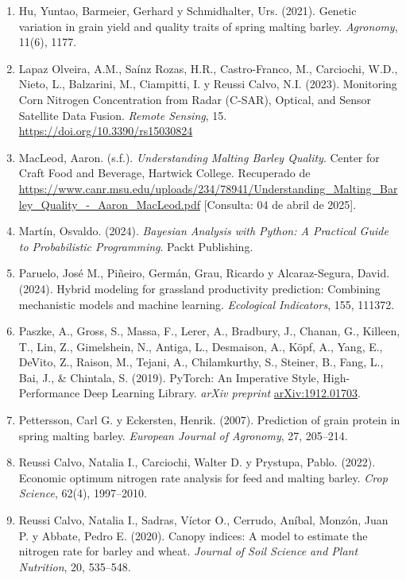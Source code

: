 \documentclass[
11pt, %
]{charter}
\begin{document}
\begin{enumerate}
    \item Hu, Yuntao, Barmeier, Gerhard y Schmidhalter, Urs. (2021). Genetic variation in grain yield and quality traits of spring malting barley. \emph{Agronomy}, 11(6), 1177.

    \item Lapaz Olveira, A.M., Saínz Rozas, H.R., Castro-Franco, M., Carciochi, W.D., Nieto, L., Balzarini, M., Ciampitti, I. y Reussi Calvo, N.I. (2023). Monitoring Corn Nitrogen Concentration from Radar (C-SAR), Optical, and Sensor Satellite Data Fusion. \emph{Remote Sensing}, 15. \url{https://doi.org/10.3390/rs15030824}

    \item MacLeod, Aaron. (s.f.). \emph{Understanding Malting Barley Quality}. Center for Craft Food and Beverage, Hartwick College. Recuperado de \url{https://www.canr.msu.edu/uploads/234/78941/Understanding_Malting_Barley_Quality_-_Aaron_MacLeod.pdf} [Consulta: 04 de abril de 2025].

    \item Martín, Osvaldo. (2024). \emph{Bayesian Analysis with Python: A Practical Guide to Probabilistic Programming}. Packt Publishing.

    \item Paruelo, José M., Piñeiro, Germán, Grau, Ricardo y Alcaraz-Segura, David. (2024). Hybrid modeling for grassland productivity prediction: Combining mechanistic models and machine learning. \emph{Ecological Indicators}, 155, 111372.

    \item Paszke, A., Gross, S., Massa, F., Lerer, A., Bradbury, J., Chanan, G., Killeen, T., Lin, Z., Gimelshein, N., Antiga, L., Desmaison, A., Köpf, A., Yang, E., DeVito, Z., Raison, M., Tejani, A., Chilamkurthy, S., Steiner, B., Fang, L., Bai, J., \& Chintala, S. (2019). PyTorch: An Imperative Style, High-Performance Deep Learning Library. \emph{arXiv preprint} \url{arXiv:1912.01703}.

    \item Pettersson, Carl G. y Eckersten, Henrik. (2007). Prediction of grain protein in spring malting barley. \emph{European Journal of Agronomy}, 27, 205–214.

    \item Reussi Calvo, Natalia I., Carciochi, Walter D. y Prystupa, Pablo. (2022). Economic optimum nitrogen rate analysis for feed and malting barley. \emph{Crop Science}, 62(4), 1997–2010.

    \item Reussi Calvo, Natalia I., Sadras, Víctor O., Cerrudo, Aníbal, Monzón, Juan P. y Abbate, Pedro E. (2020). Canopy indices: A model to estimate the nitrogen rate for barley and wheat. \emph{Journal of Soil Science and Plant Nutrition}, 20, 535–548.


\end{enumerate}
\end{document}
